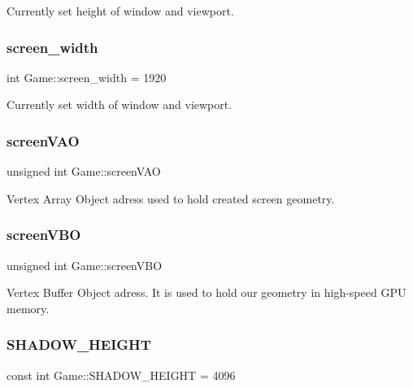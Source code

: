 Currently set height of window and viewport. 

\mbox{\label{class_game_ac05df6adfb712932bac2afea1fb01dc3}} 
\subsubsection{\texorpdfstring{screen\_width}{screen\_width}}
{\footnotesize\ttfamily int Game\+::screen\+\_\+width = 1920\hspace{0.3cm}{\ttfamily [protected]}}



Currently set width of window and viewport. 

\mbox{\label{class_game_a92aabad09ef89df6964b62b89c2f7edb}} 
\subsubsection{\texorpdfstring{screenVAO}{screenVAO}}
{\footnotesize\ttfamily unsigned int Game\+::screen\+V\+AO\hspace{0.3cm}{\ttfamily [protected]}}



Vertex Array Object adress used to hold created screen geometry. 

\mbox{\label{class_game_a64dfde0688161bc1d584fc448c496e49}} 
\subsubsection{\texorpdfstring{screenVBO}{screenVBO}}
{\footnotesize\ttfamily unsigned int Game\+::screen\+V\+BO\hspace{0.3cm}{\ttfamily [protected]}}



Vertex Buffer Object adress. It is used to hold our geometry in high-\/speed G\+PU memory. 

\mbox{\label{class_game_a6ff4bf491706f3c85c1de2ed7983a51b}} 
\subsubsection{\texorpdfstring{SHADOW\_HEIGHT}{SHADOW\_HEIGHT}}
{\footnotesize\ttfamily const int Game\+::\+S\+H\+A\+D\+O\+W\+\_\+\+H\+E\+I\+G\+HT = 4096\hspace{0.3cm}{\ttfamily [protected]}}



